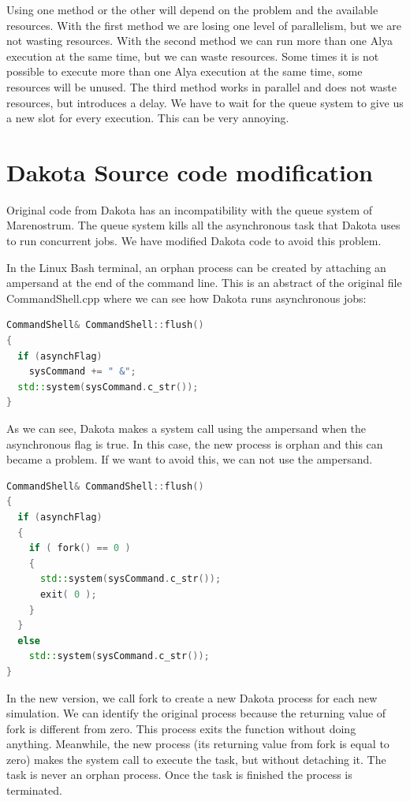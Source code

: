 \documentclass[12pt,a4paper,article]{memoir}
\begin{document}
Using one method or the other will depend on the problem and the available resources. With the first method we are losing one level of parallelism, but we are not wasting resources. With the second method we can run more than one Alya execution at the same time, but we can waste resources. Some times it is not possible to execute more than one Alya execution at the same time, some resources will be unused. The third method works in parallel and does not waste resources, but introduces a delay. We have to wait for the queue system to give us a new slot for every execution. This can be very annoying.

\appendix

\chapter{Dakota Source code modification}
\label{chapter:CodeMod}

Original code from Dakota has an incompatibility with the queue system of Marenostrum. The queue system kills all the asynchronous task that Dakota uses to run concurrent jobs. We have modified Dakota code to avoid this problem.

In the Linux Bash terminal, an orphan process can be created by attaching an ampersand at the end of the command line. This is an abstract of the original file CommandShell.cpp where we can see how Dakota runs asynchronous jobs:

\begin{lstlisting}[style=MyCodeStyle,language=C++]
CommandShell& CommandShell::flush()
{
  if (asynchFlag)
    sysCommand += " &";
  std::system(sysCommand.c_str());
}
\end{lstlisting}

As we can see, Dakota makes a system call using the ampersand when the asynchronous flag is true. In this case, the new process is orphan and this can became a problem. If we want to avoid this, we can not use the ampersand.

\begin{lstlisting}[style=MyCodeStyle,language=C++]
CommandShell& CommandShell::flush()
{
  if (asynchFlag)
  {
    if ( fork() == 0 )
    {
      std::system(sysCommand.c_str());
      exit( 0 );
    }
  }
  else
    std::system(sysCommand.c_str());
}
\end{lstlisting}

In the new version, we call fork to create a new Dakota process for each new simulation. We can identify the original process because the returning value of fork is different from zero. This process exits the function without doing anything. Meanwhile, the new process (its returning value from fork is equal to zero) makes the system call to execute the task, but without detaching it. The task is never an orphan process. Once the task is finished the process is terminated.
\end{document}

